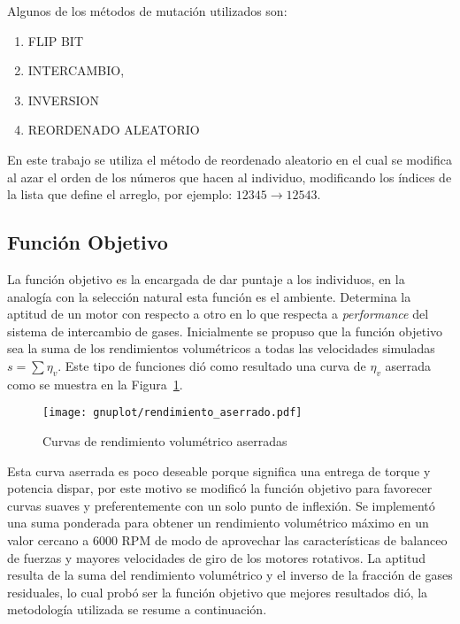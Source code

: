 Algunos de los métodos de mutación utilizados son:

\begin{enumerate}
  \item FLIP BIT
  \item INTERCAMBIO,
  \item INVERSION
  \item REORDENADO ALEATORIO
\end{enumerate}


En este trabajo se utiliza el método de reordenado aleatorio en el cual se
modifica al azar el orden de los números que hacen al individuo, modificando los
índices de la lista que define el arreglo, por ejemplo:
$12345 \rightarrow 12543$.

\subsection{Función Objetivo}\label{sec:funcion_objetivo}
%
La función objetivo es la encargada de dar puntaje a los individuos, en la
analogía con la selección natural esta función es el ambiente.
%
Determina la aptitud de un motor con respecto a otro en lo que respecta a
\emph{performance} del sistema de intercambio de gases.
%
Inicialmente se propuso que la función objetivo sea la suma de los rendimientos
volumétricos a todas las velocidades simuladas $s=\sum \eta_{v}$.
%
Este tipo de funciones dió como resultado una curva de $\eta_{v}$ aserrada como
se muestra en la Figura~\ref{fig:curva_aserrada}.

\begin{figure}[ht]
  \centering
  \texttt{[image: gnuplot/rendimiento\_aserrado.pdf]}
  \caption{Curvas de rendimiento volumétrico aserradas}\label{fig:curva_aserrada}
\end{figure}

Esta curva aserrada es poco deseable porque significa una entrega de torque y
potencia dispar, por este motivo se modificó la función objetivo para favorecer
curvas suaves y preferentemente con un solo punto de inflexión.
%
Se implementó una suma ponderada para obtener un rendimiento volumétrico máximo
en un valor cercano a 6000 RPM de modo de aprovechar las características de
balanceo de fuerzas y mayores velocidades de giro de los motores rotativos.
%
La aptitud resulta de la suma del rendimiento volumétrico y el inverso de la
fracción de gases residuales, lo cual probó ser la función objetivo que mejores
resultados dió, la metodología utilizada se resume a continuación.

